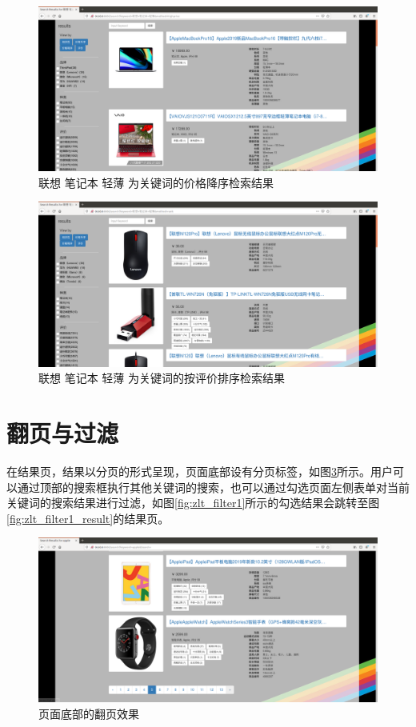 \begin{figure}[htbp]
\centering
\includegraphics[width=13.5cm]{img/zlt/decreasing_price.png}
\caption{联想 笔记本 轻薄 为关键词的价格降序检索结果}
\label{fig:zlt_decreasing_price}
\end{figure}

\begin{figure}[htbp]
\centering
\includegraphics[width=13.5cm]{img/zlt/high_rank.png}
\caption{联想 笔记本 轻薄 为关键词的按评价排序检索结果}
\label{fig:zlt_high_rank}
\end{figure}

\section{翻页与过滤}

在结果页，结果以分页的形式呈现，页面底部设有分页标签，如图\ref{fig:zlt_leaf_flip}所示。用户可以通过顶部的搜索框执行其他关键词的搜索，也可以通过勾选页面左侧表单对当前关键词的搜索结果进行过滤，如图\ref{fig:zlt_filter1}所示的勾选结果会跳转至图\ref{fig:zlt_filter1_result}的结果页。

\begin{figure}[htbp]
\centering
\includegraphics[width=13.5cm]{img/zlt/leafflip.png}
\caption{页面底部的翻页效果}
\label{fig:zlt_leaf_flip}
\end{figure}

